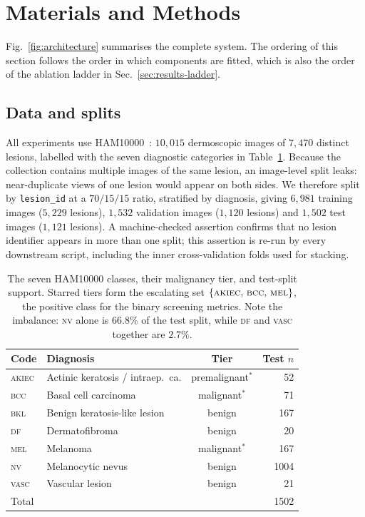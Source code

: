 \documentclass[journal]{IEEEtran}
\newcommand{\escset}{\{\textsc{akiec},\,\textsc{bcc},\,\textsc{mel}\}}
\begin{document}
\section{Materials and Methods}
\label{sec:methods}

Fig.~\ref{fig:architecture} summarises the complete system. The ordering of this section
follows the order in which components are fitted, which is also the order of the ablation
ladder in Sec.~\ref{sec:results-ladder}.

\subsection{Data and splits}
All experiments use HAM10000~\cite{tschandl2018ham10000}: $10{,}015$ dermoscopic images of
$7{,}470$ distinct lesions, labelled with the seven diagnostic categories in
Table~\ref{tab:classes}. Because the collection contains multiple images of the same lesion,
an image-level split leaks: near-duplicate views of one lesion would appear on both sides.
We therefore split by \texttt{lesion\_id} at a $70/15/15$ ratio, stratified by diagnosis,
giving $6{,}981$ training images ($5{,}229$ lesions), $1{,}532$ validation images ($1{,}120$
lesions) and $1{,}502$ test images ($1{,}121$ lesions). A machine-checked assertion confirms
that no lesion identifier appears in more than one split; this assertion is re-run by every
downstream script, including the inner cross-validation folds used for stacking.

\begin{table}[t]
\centering
\caption{The seven HAM10000 classes, their malignancy tier, and test-split support.
Starred tiers form the escalating set $\escset$, the positive class for the binary
screening metrics. Note the imbalance: \textsc{nv} alone is $66.8\%$ of the test split,
while \textsc{df} and \textsc{vasc} together are $2.7\%$.}
\label{tab:classes}
\begin{tabular}{llcr}
\toprule
Code & Diagnosis & Tier & Test $n$ \\
\midrule
\textsc{akiec} & Actinic keratosis / intraep.\ ca. & premalignant$^\ast$ & 52 \\
\textsc{bcc}   & Basal cell carcinoma              & malignant$^\ast$    & 71 \\
\textsc{bkl}   & Benign keratosis-like lesion      & benign              & 167 \\
\textsc{df}    & Dermatofibroma                    & benign              & 20 \\
\textsc{mel}   & Melanoma                          & malignant$^\ast$    & 167 \\
\textsc{nv}    & Melanocytic nevus                 & benign              & 1004 \\
\textsc{vasc}  & Vascular lesion                   & benign              & 21 \\
\midrule
\multicolumn{3}{l}{Total} & 1502 \\
\bottomrule
\end{tabular}
\end{table}
\end{document}
